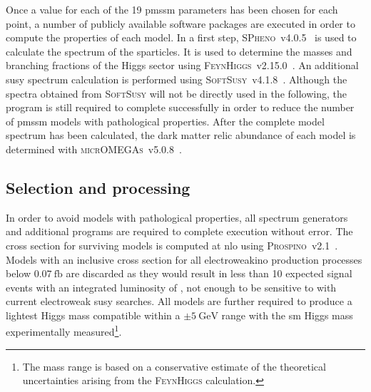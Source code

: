 Once a value for each of the 19 \gls{pmssm} parameters has been chosen for each point, a number of publicly available software packages are executed in order to compute the properties of each model.
In a first step, \textsc{SPheno}~v4.0.5~\cite{spheno_1:2003um,spheno_2:2011nf} is used to calculate the spectrum of the sparticles.
It is used to determine the masses and branching fractions of the Higgs sector using \textsc{FeynHiggs}~v2.15.0~\cite{FeynHiggs:1998yj,FeynHiggs_1:2018qog,FeynHiggs_2:2013ria}.
An additional \gls{susy} spectrum calculation is performed using \textsc{SoftSusy}~v4.1.8~\cite{softsusy:2001kg}.
Although the spectra obtained from \textsc{SoftSusy} will not be directly used in the following, the program is still required to complete successfully in order to reduce the number of \gls{pmssm} models with pathological properties.
After the complete model spectrum has been calculated, the dark matter relic abundance of each model is determined with \textsc{micrOMEGAs}~v5.0.8~\cite{micromegas_1:2006is,micromegas_2:2010pz}.


\subsection{Selection and processing}

In order to avoid models with pathological properties, all spectrum generators and additional programs are required to complete execution without error. The cross section for surviving models is computed at \gls{nlo} using \textsc{Prospino}~v2.1~\cite{prospino:314229, prospino_2:1999xh}. Models with an inclusive cross section for all electroweakino production processes below $\SI{0.07}{\femto\barn}$ are discarded as they would result in less than 10 expected signal events with an integrated luminosity of \onethirtynineifb, not enough to be sensitive to with current electroweak \gls{susy} searches. 
All models are further required to produce a lightest Higgs mass compatible within a $\pm\SI{5}{\GeV}$ range with the \gls{sm} Higgs mass experimentally measured\footnote{The mass range is based on a conservative estimate of the theoretical uncertainties arising from the \textsc{FeynHiggs} calculation.}.

